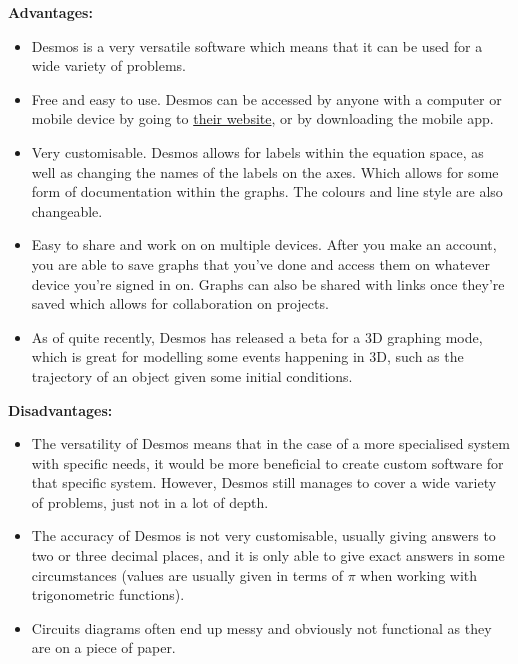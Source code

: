 \documentclass[tikz, 11pt]{article}
\begin{document}
                \pagebreak
                \textbf{Advantages:}
                \begin{itemize}
                    \item Desmos is a very versatile software which means that it can be used for a wide variety of problems. 
                    \item Free and easy to use. Desmos can be accessed by anyone with a computer or mobile device by going to \href{https://www.desmos.com/calculator}{their website}, or by downloading the mobile app.
                    \item Very customisable. Desmos allows for labels within the equation space, as well as changing the names of the labels on the axes. Which allows for some form of documentation within the graphs. The colours and line style are also changeable.
                    \item Easy to share and work on on multiple devices. After you make an account, you are able to save graphs that you've done and access them on whatever device you're signed in on. Graphs can also be shared with links once they're saved which allows for collaboration on projects.
                    \item As of quite recently, Desmos has released a beta for a 3D graphing mode, which is great for modelling some events happening in 3D, such as the trajectory of an object given some initial conditions.
                \end{itemize}

                \textbf{Disadvantages:}
                \begin{itemize}
                    \item The versatility of Desmos means that in the case of a more specialised system with specific needs, it would be more beneficial to create custom software for that specific system. However, Desmos still manages to cover a wide variety of problems, just not in a lot of depth.
                    \item The accuracy of Desmos is not very customisable, usually giving answers to two or three decimal places, and it is only able to give exact answers in some circumstances (values are usually given in terms of $\pi$ when working with trigonometric functions).
                    \item Circuits diagrams often end up messy and obviously not functional as they are on a piece of paper.
                \end{itemize}
\end{document}
